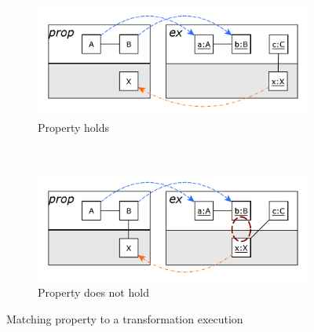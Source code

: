 \begin{figure}[htb]
        \centering
        \begin{subfigure}[b]{0.40\textwidth}
                \centering
                \includegraphics[width=1\textwidth]{./figures/property_proving/prop_execution_without_traceability.pdf}
                \caption{Property holds}
                \label{fig:prop_execution_without_traceability}
        \end{subfigure}%
        \\
        \begin{subfigure}[b]{0.40\textwidth}
                \centering
                \includegraphics[width=1\textwidth]{./figures/property_proving/prop_execution_with_traceability.pdf}
                \caption{Property does not hold}
                \label{fig:prop_execution_with_traceability}
        \end{subfigure}%
        \caption{Matching property to a transformation execution}
        \label{fig:prop_execution}
\end{figure}

